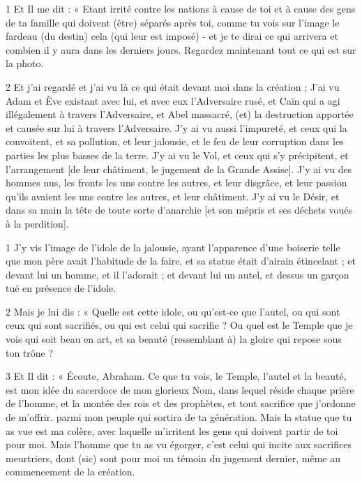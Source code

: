 
\par 1 Et Il me dit : « Etant irrité contre les nations à cause de toi et à cause des gens de ta famille qui doivent (être) séparés après toi, comme tu vois sur l'image le fardeau (du destin) cela (qui leur est imposé) - et je te dirai ce qui arrivera et combien il y aura dans les derniers jours. Regardez maintenant tout ce qui est sur la photo.

\par 2 Et j'ai regardé et j'ai vu là ce qui était devant moi dans la création ; J'ai vu Adam et Ève existant avec lui, et avec eux l'Adversaire rusé, et Caïn qui a agi illégalement à travers l'Adversaire, et Abel massacré, (et) la destruction apportée et causée sur lui à travers l'Adversaire. J'y ai vu aussi l'impureté, et ceux qui la convoitent, et sa pollution, et leur jalousie, et le feu de leur corruption dans les parties les plus basses de la terre. J'y ai vu le Vol, et ceux qui s'y précipitent, et l'arrangement [de leur châtiment, le jugement de la Grande Assise]. J'y ai vu des hommes nus, les fronts les uns contre les autres, et leur disgrâce, et leur passion qu'ils avaient les uns contre les autres, et leur châtiment. J'y ai vu le Désir, et dans sa main la tête de toute sorte d'anarchie [et son mépris et ses déchets voués à la perdition].


\par 1 J'y vis l'image de l'idole de la jalousie, ayant l'apparence d'une boiserie telle que mon père avait l'habitude de la faire, et sa statue était d'airain étincelant ; et devant lui un homme, et il l'adorait ; et devant lui un autel, et dessus un garçon tué en présence de l'idole.

\par 2 Mais je lui dis : « Quelle est cette idole, ou qu'est-ce que l'autel, ou qui sont ceux qui sont sacrifiés, ou qui est celui qui sacrifie ? Ou quel est le Temple que je vois qui soit beau en art, et sa beauté (ressemblant à) la gloire qui repose sous ton trône ?

\par 3 Et Il dit : « Écoute, Abraham. Ce que tu vois, le Temple, l'autel et la beauté, est mon idée du sacerdoce de mon glorieux Nom, dans lequel réside chaque prière de l'homme, et la montée des rois et des prophètes, et tout sacrifice que j'ordonne de m'offrir. parmi mon peuple qui sortira de ta génération. Mais la statue que tu as vue est ma colère, avec laquelle m'irritent les gens qui doivent partir de toi pour moi. Mais l'homme que tu as vu égorger, c'est celui qui incite aux sacrifices meurtriers, dont (sic) sont pour moi un témoin du jugement dernier, même au commencement de la création.

